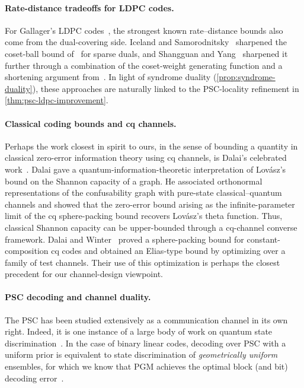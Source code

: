\documentclass[11pt]{article}
\theoremstyle{remark}
\begin{document}
\paragraph{Rate-distance tradeoffs for LDPC codes.} For Gallager's LDPC codes~\cite{Gal62}, the strongest known rate--distance bounds also come from the dual-covering side. Iceland and Samorodnitsky~\cite{IS15} sharpened the coset-ball bound of~\cite{NS09} for sparse duals, and Shangguan and Yang~\cite{SY26} sharpened it further through a combination of the coset-weight generating function and a shortening argument from~\cite{BHL06}. In light of syndrome duality (\cref{prop:syndrome-duality}), these approaches are naturally linked to the PSC-locality refinement in \cref{thm:psc-ldpc-improvement}.

\paragraph{Classical coding bounds and cq channels.} Perhaps the work closest in spirit to ours, in the sense of bounding a quantity in classical zero-error information theory using cq channels, is Dalai's celebrated work~\cite{Dal13}. Dalai gave a quantum-information-theoretic interpretation of Lov\'asz's bound on the Shannon capacity of a graph. He associated orthonormal representations of the confusability graph with pure-state classical--quantum channels and showed that the zero-error bound arising as the infinite-parameter limit of the cq sphere-packing bound recovers Lov\'asz's theta function. Thus, classical Shannon capacity can be upper-bounded through a cq-channel converse framework. Dalai and Winter~\cite{DW17} proved a sphere-packing bound for constant-composition cq codes and obtained an Elias-type bound by optimizing over a family of test channels. Their use of this optimization is perhaps the closest precedent for our channel-design viewpoint.

\paragraph{PSC decoding and channel duality.} The PSC has been studied extensively as a communication channel in its own right. Indeed, it is one instance of a large body of work on quantum state discrimination~\cite{Hel69,Hol73b,YKL75,HW94,BK02}. In the case of binary linear codes, decoding over PSC with a uniform prior is equivalent to state discrimination of \emph{geometrically uniform} ensembles, for which we know that PGM achieves the optimal block (and bit) decoding error~\cite{BKMH97,UTHH99,EF01,EMV04,ZCCL25,PR25}. 
\end{document}

